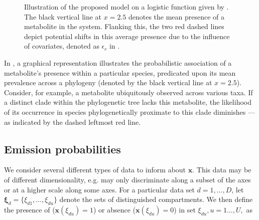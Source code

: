 \documentclass[
11pt, %
oneside, %
english, %
singlespacing, %
headsepline, %
chapterinoneline, %
]{MastersDoctoralThesis} %
\def\x{\boldsymbol{x}}
\def\bxi{\boldsymbol{\xi}}
\begin{document}
\begin{figure}[h]
	\centering
	\caption{Illustration of the proposed model on a logistic function given by . The black vertical line at $x=2.5$ denotes the mean presence of a metabolite in the system. Flanking this, the two red dashed lines depict potential shifts in this average presence due to the influence of covariates, denoted as $\epsilon_c$ in .}
	\label{fig: example sigmoid function}
\end{figure}

In , a graphical representation illustrates the probabilistic association of a metabolite's presence within a particular species, predicated upon its mean prevalence across a phylogeny (denoted by the black vertical line at $x=2.5$). Consider, for example, a metabolite ubiquitously observed across various taxa. If a distinct clade within the phylogenetic tree lacks this metabolite, the likelihood of its occurrence in species phylogenetically proximate to this clade diminishes — as indicated by the dashed leftmost red line.
	
	\subsection{Emission probabilities}\label{subsec:emission probabilities}
	We consider several different types of data to inform about $\x$. This data may be of different dimensionality, e.g. may only discriminate along a subset of the axes or at a higher scale along some axes. For a particular data set $d=1, \ldots, D$, let $\bxi_d=\{\xi_{d1}, \ldots, \xi_{du}\}$ denote the sets of distinguished compartments. We then define the presence of ($\x(\xi_{du})=1$) or absence ($\x(\xi_{du})=0$) in set $\xi_{du}, u=1\ldots,U,$ as
	
\end{document}
